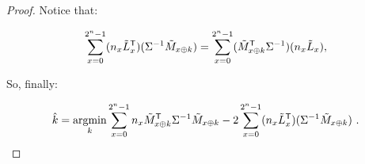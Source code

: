 \documentclass[conference,twocolumn]{IEEEtran}
\DeclareMathOperator*\argmin{argmin}
\begin{document}
\begin{proof}

Notice that: 

$$\sum_{x=0}^{2^n-1}(n_x \Tilde{L}^\mathsf{T}_x)(\Sigma^{-1}\Tilde{M}_{x\oplus k}) = \sum_{x=0}^{2^n-1} (\Tilde{M}^\mathsf{T}_{x\oplus k} \Sigma^{-1})(n_x \Tilde{L}_x),$$ 




So, finally: 


$$\Hat{k} = \argmin_k \space \sum_{x=0}^{2^n-1} n_x \Tilde{M}^\mathsf{T}_{x \oplus k} \Sigma^{-1}  \Tilde{M}_{x \oplus k} - 2\sum_{x=0}^{2^n-1}(n_x \Tilde{L}^\mathsf{T}_x)(\Sigma^{-1}\Tilde{M}_{x\oplus k}) \ .$$
\end{proof}
\end{document}
